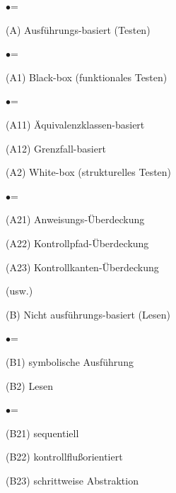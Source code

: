 \begin{list}{$\bullet$}{\leftmargin=}

\item[(A)] Ausf\"uhrungs-basiert (Testen)

\begin{list}{$\bullet$}{\leftmargin=}

\item [(A1)] Black-box (funktionales Testen)

\begin{list}{$\bullet$}{\leftmargin=}
\item[(A11)] \"Aquivalenzklassen-basiert
\item[(A12)] Grenzfall-basiert

\end{list}

\item[(A2)] White-box (strukturelles Testen)

\begin{list}{$\bullet$}{\leftmargin=}
\item[(A21)] Anweisungs-\"Uberdeckung
\item[(A22)] Kontrollpfad-\"Uberdeckung
\item[(A23)] Kontrollkanten-\"Uberdeckung

(usw.)
\end{list}

\end{list}

\item [(B)] Nicht ausf\"uhrungs-basiert (Lesen)

\begin{list}{$\bullet$}{\leftmargin=}
\item [(B1)] symbolische Ausf\"uhrung
\item [(B2)] Lesen

\begin{list}{$\bullet$}{\leftmargin=}
\item[(B21)] sequentiell
\item[(B22)] kontrollflu{\ss}orientiert
\item[(B23)] schrittweise Abstraktion
\end{list}

\end{list}

\end{list}

